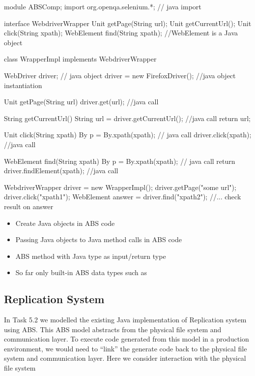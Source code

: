 \documentclass[a4paper,11pt,final]{article}
\begin{document}
\begin{absexamplen}
module ABSComp;
import org.openqa.selenium.*; // java import

interface WebdriverWrapper {
  Unit getPage(String url); 
  Unit getCurrentUrl();
  Unit click(String xpath);
  WebElement find(String xpath); //WebElement is a Java object
}

class WrapperImpl implements WebdriverWrapper {
  WebDriver driver; // java object
  {
    driver = new FirefoxDriver(); //java object instantiation
  }
  
  Unit getPage(String url) {
    driver.get(url); //java call
  }
	
  String getCurrentUrl() {
    String url = driver.getCurrentUrl(); //java call
    return url;
  }
  
  Unit click(String xpath) {
     By p = By.xpath(xpath); // java call
     driver.click(xpath); //java call
  }
  
  WebElement find(String xpath) {
     By p = By.xpath(xpath); // java call
     return driver.findElement(xpath); //java call
  }
}

{
   WebdriverWrapper driver = new WrapperImpl();
   driver.getPage("some url");
   driver.click("xpath1");
   WebElement answer = driver.find("xpath2");
   //... check result on answer
}
\end{absexamplen}

\begin{itemize}
  \item Create Java objects in ABS code
  \item Passing Java objects to Java method calls in ABS code 
  \item ABS method with Java type as input/return type
  \item So far only built-in ABS data types such as 
\end{itemize}

\subsection{Replication System}
In Task 5.2 we modelled the existing Java implementation of Replication system
using ABS. This ABS model abstracts from the physical file system and
communication layer. To execute code generated from this model in a production
environment, we would need to ``link'' the generate code back to the physical
file system and communication layer. Here we consider interaction with the
physical file system
\end{document}
